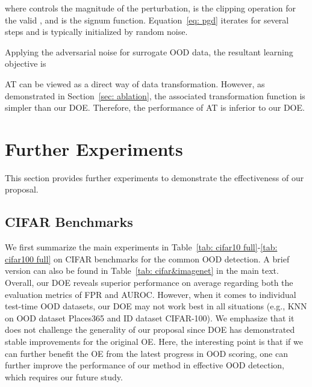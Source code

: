 \documentclass{article} \usepackage{iclr2022_conference,times}
\def\Eqref#1{Equation~\ref{#1}}
\begin{document}
where  controls the magnitude of the perturbation,   is the clipping operation for the valid , and  is the signum function. \Eqref{eq: pgd} iterates for several steps and 
 is typically initialized by random noise. 

Applying the adversarial noise for surrogate OOD data, the resultant learning objective is 

AT can be viewed as a direct way of data transformation. However, as demonstrated in Section~\ref{sec: ablation}, the associated transformation function is simpler than our DOE. Therefore, the performance of AT is inferior to our DOE.  

\clearpage
\section{Further Experiments} \label{app: exp}

This section provides further experiments to demonstrate the effectiveness of our proposal. 

\subsection{CIFAR Benchmarks}\label{app: cifar}

We first summarize the main experiments in Table~\ref{tab: cifar10 full}-\ref{tab: cifar100 full} on CIFAR benchmarks for the common OOD detection. A brief version can also be found in Table~\ref{tab: cifar&imagenet} in the main text. Overall, our DOE reveals superior performance on average regarding both the evaluation metrics of FPR and AUROC. However, when it comes to individual test-time OOD datasets, our DOE may not work best in all situations (e.g., KNN on OOD dataset Places365 and ID dataset CIFAR-100). We emphasize that it does not challenge the generality of our proposal since DOE has demonstrated stable improvements for the original OE. Here, the interesting point is that if we can further benefit the OE from the latest progress in OOD scoring, one can further improve the performance of our method in effective OOD detection, which requires our future study. 
\end{document}

